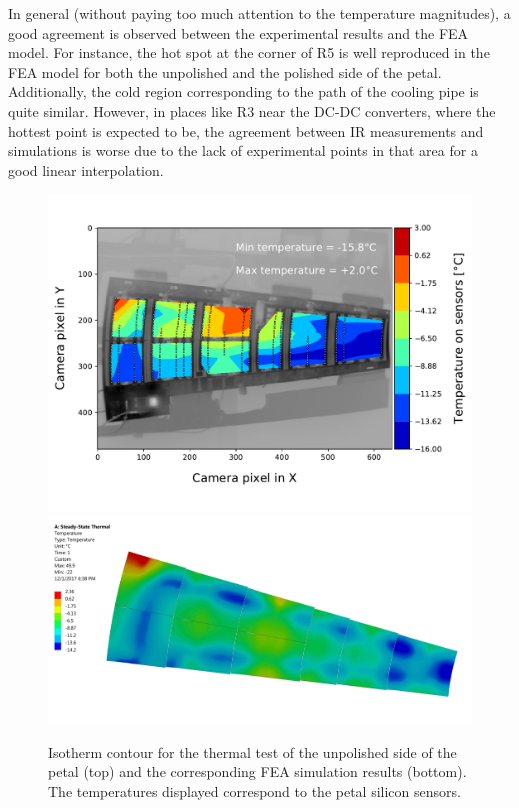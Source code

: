 		In general (without paying too much attention to the temperature magnitudes), a good agreement is observed between the experimental results and the FEA model. For instance, the hot spot at the corner of R5 is well reproduced in the FEA model for both the unpolished and the polished side of the petal. Additionally, the cold region corresponding to the path of the cooling pipe is quite similar. However, in places like R3 near the DC-DC converters, where the hottest point is expected to be, the agreement between IR measurements and simulations is worse due to the lack of experimental points in that area for a good linear interpolation.
	
		\begin{landscape}	
			\begin{figure}
				\centering
				\captionsetup{justification=centering,margin=0cm}
				\includegraphics[scale=0.65]{Figures/Chapter04/thermogram_markers_2_201711271001.pdf}
				\includegraphics[scale=0.045]{Figures/Chapter04/FEA_thermogram_markers_2_201711271001.jpg}
				\caption{Isotherm contour for the thermal test of the unpolished side of the petal (top) and the corresponding FEA simulation results (bottom). The temperatures displayed correspond to the petal silicon sensors.}\label{fig4.7}
			\end{figure}	
		\end{landscape}	
		
